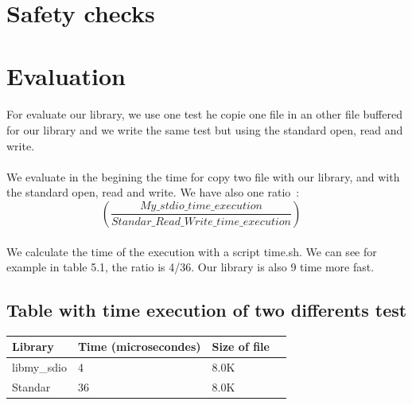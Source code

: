 \documentclass[a4paper,10pt]{article}
\begin{document}
\section{Safety checks}

\section{Evaluation}
\paragraph{}
For evaluate our library, we use one test he copie one file in an
other file buffered for our library and we write the same test 
but using the standard open, read and write.
\paragraph{}
We evaluate in the begining the time for copy two file with our library, 
and with the standard open, read and write. We have also one ratio~: 
\begin{equation}
\left(\frac{My\_stdio\_time\_execution}{Standar\_Read\_Write\_time\_execution} \right)  \quad
\end{equation}
\paragraph{}
We calculate the time of the execution with a script time.sh. We can see
for example in table 5.1, the ratio is 4/36. Our library is also 9 time
more fast. 

\subsection{Table with time execution of two differents test}
\begin{tabular}{|R{2cm}|C{2cm}|L{1.5cm}|L{1.5cm}|}
\hline {}Library & Time (microsecondes) & Size of file\\
\hline  libmy\_sdio & 4 & 8.0K \\
\hline  Standar  & 36 & 8.0K \\
\hline 
\end{tabular}
\end{document}
